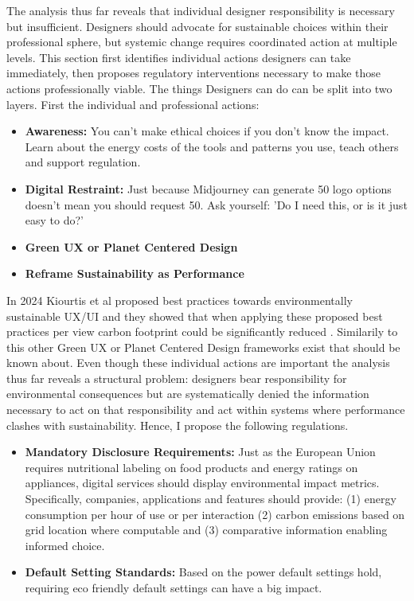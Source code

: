 The analysis thus far reveals that individual designer responsibility is necessary
but insufficient. Designers should advocate for sustainable choices within their
professional sphere, but systemic change requires coordinated action at multiple
levels. This section first identifies individual actions designers can take
immediately, then proposes regulatory interventions necessary to make those
actions professionally viable. The things Designers can do can be split into two layers. First the individual and professional actions:
\begin{itemize}
  \item \textbf{Awareness:} You can't make ethical choices if you don't know the impact. Learn about the energy costs of the tools and patterns you use, teach others and support regulation.
\item \textbf{Digital Restraint:} Just because Midjourney can generate 50 logo options doesn't mean you should request 50. Ask yourself: 'Do I need this, or is it just easy to do?'
  \item \textbf{Green UX or Planet Centered Design}
\item \textbf{Reframe Sustainability as Performance}
\end{itemize}
In 2024 Kiourtis et al proposed best practices towards environmentally sustainable UX/UI and they showed that when applying these proposed best practices per view carbon footprint could be significantly reduced \cite{Kiourtis}. Similarily to this other Green UX or Planet Centered Design frameworks exist that should be known about. Even though these individual actions are important
the analysis thus far reveals a structural problem: designers bear responsibility for environmental consequences but are systematically denied the information necessary to act on that responsibility and act within systems where performance clashes with sustainability. Hence, I propose the following regulations.
\begin{itemize}
\item \textbf{Mandatory Disclosure Requirements:} Just as the European Union requires nutritional labeling on food products and energy ratings on appliances, digital services should display environmental impact metrics. Specifically, companies, applications and features should provide: (1) energy consumption per hour of use or per interaction (2) carbon emissions based on grid location where computable and (3) comparative information enabling informed choice.
\item \textbf{Default Setting Standards:} Based on the power default settings hold, requiring eco friendly default settings can have a big impact.
\end{itemize}
